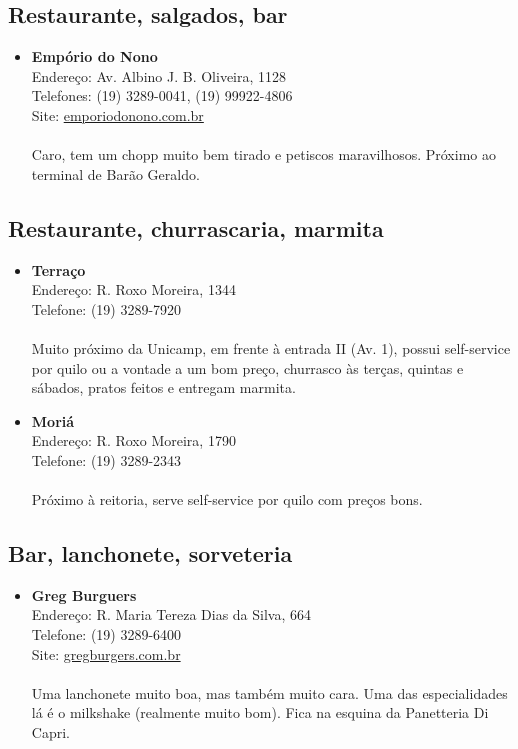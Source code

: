 \subsection{Restaurante, salgados, bar}

\begin{itemize}
\item \textbf{Empório do Nono}
  \\Endereço: Av. Albino J. B. Oliveira, 1128
  \\Telefones: (19) 3289-0041, (19) 99922-4806
  \\Site: \url{emporiodonono.com.br}
  \\
  \\Caro, tem um chopp muito bem tirado e petiscos maravilhosos. Próximo ao
  terminal de Barão Geraldo.
\end{itemize}

\subsection{Restaurante, churrascaria, marmita}

\begin{itemize}
\item \textbf{Terraço}
  \\Endereço: R. Roxo Moreira, 1344
  \\Telefone: (19) 3289-7920
  \\
  \\Muito próximo da Unicamp, em frente à entrada II (Av. 1), possui
  self-service por quilo ou a vontade a um bom preço, churrasco às terças,
  quintas e sábados, pratos feitos e entregam marmita.

\item \textbf{Moriá}
  \\Endereço: R. Roxo Moreira, 1790
  \\Telefone: (19) 3289-2343
  \\
  \\Próximo à reitoria, serve self-service por quilo com preços bons.
\end{itemize}

\subsection{Bar, lanchonete, sorveteria}

\begin{itemize}
\item \textbf{Greg Burguers}
  \\Endereço: R. Maria Tereza Dias da Silva, 664
  \\Telefone: (19) 3289-6400
  \\Site: \url{gregburgers.com.br}
  \\
  \\Uma lanchonete muito boa, mas também muito cara. Uma das especialidades lá
  é o milkshake (realmente muito bom). Fica na esquina da Panetteria Di Capri.
\end{itemize}

